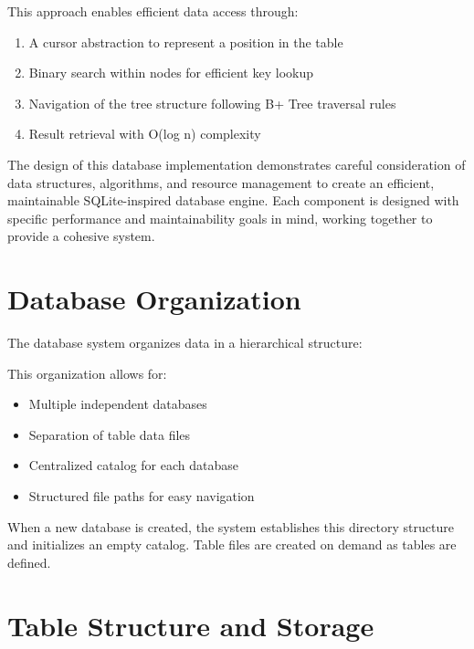 \documentclass[12pt,a4paper]{article}  %
\newenvironment{highlight}{%
  \begin{tcolorbox}[
    colback=lightgray,
    colframe=uetblue,
    boxrule=0.5pt,
    arc=2mm,
    beforeafter skip=12pt,
    width=\textwidth,
    enlarge left by=-2mm,
    enlarge right by=-2mm
  ]
}{%
  \end{tcolorbox}
}
\begin{document}
This approach enables efficient data access through:
\begin{enumerate}
    \item A cursor abstraction to represent a position in the table
    \item Binary search within nodes for efficient key lookup
    \item Navigation of the tree structure following B+ Tree traversal rules
    \item Result retrieval with O(log n) complexity
\end{enumerate}

\begin{highlight}
The design of this database implementation demonstrates careful consideration of data structures, algorithms, and resource management to create an efficient, maintainable SQLite-inspired database engine. Each component is designed with specific performance and maintainability goals in mind, working together to provide a cohesive system.
\end{highlight}

\section{Database Organization}

The database system organizes data in a hierarchical structure:


This organization allows for:

\begin{itemize}
    \item Multiple independent databases
    \item Separation of table data files
    \item Centralized catalog for each database
    \item Structured file paths for easy navigation
\end{itemize}

When a new database is created, the system establishes this directory structure and initializes an empty catalog. Table files are created on demand as tables are defined.

\section{Table Structure and Storage}
\end{document}
